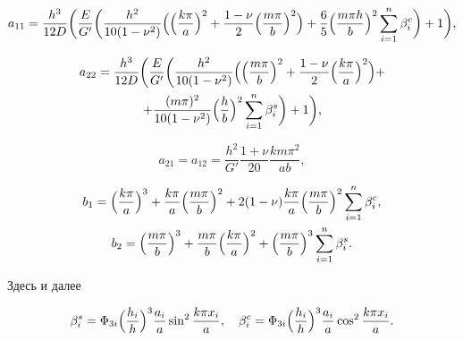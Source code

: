 \begin{equation*}

a_{11}=\frac{h^3}{12 D}

\biggl(\frac{E}{G'}\biggl(\frac{h^2}{10(1-\nu^2)}\Bigl(\Bigl(\frac{k \pi}{a}\Bigr)^2+\frac{1-\nu}{2}

\Bigl(\frac{m \pi}{b}\Bigr)^2\Bigr)+\frac{6}{5}\Bigl(\frac{m \pi h}{b}\Bigr)^2

\sum_{i=1}^n \beta_i^c\biggr)+1\biggr),

\end{equation*}

\begin{multline}

a_{22}=\frac{h^3}{12 D}

\biggl(\frac{E}{G'}\biggl(\frac{h^2}{10(1-\nu^2)}

\Bigl(\Bigl(\frac{m\pi}{b}\Bigr)^2+\frac{1-\nu}{2}\Bigl(\frac{k\pi}{a}\Bigr)^2 \Bigr)+ 

\\

+\frac{(m\pi)^2}{10(1-\nu^2)}\Bigl(\frac{h}{b}\Bigr)^2\sum_{i=1}^n \beta_i^s\biggr)+1\biggr),

\end{multline}

\begin{equation}\label{eq:myl:f10}

    a_{21}=a_{12}=\frac{h^2}{G'}\frac{1+\nu}{20}\frac{km\pi^2}{ab},

\end{equation}

\begin{gather*}

b_1=\Bigl(\frac{k\pi}{a}\Bigr)^3+\frac{k\pi}{a}\Bigl(\frac{m\pi}{b}\Bigr)^2+2(1-\nu)\frac{k\pi}{a}\Bigl(\frac{m\pi}{b}\Bigr)^2 \sum_{i=1}^n \beta_i^c,

\\

b_2=\Bigl(\frac{m\pi}{b}\Bigr)^3+\frac{m\pi}{b}\Bigl(\frac{k\pi}{a}\Bigr)^2+

\Bigl(\frac{m\pi}{b}\Bigr)^3 \sum_{i=1}^n \beta_i^s.

\end{gather*}

Здесь и далее

\begin{equation*}

\beta_i^s=\Phi_{3i}\Bigl(\frac{h_i}{h}\Bigr)^3\frac{a_i}{a}\sin^2 \frac{k \pi x_i}{a}, \quad  \beta_i^c=\Phi_{3i}\Bigl(\frac{h_i}{h}\Bigr)^3\frac{a_i}{a}\cos^2 \frac{k \pi x_i}{a}.

\end{equation*}

